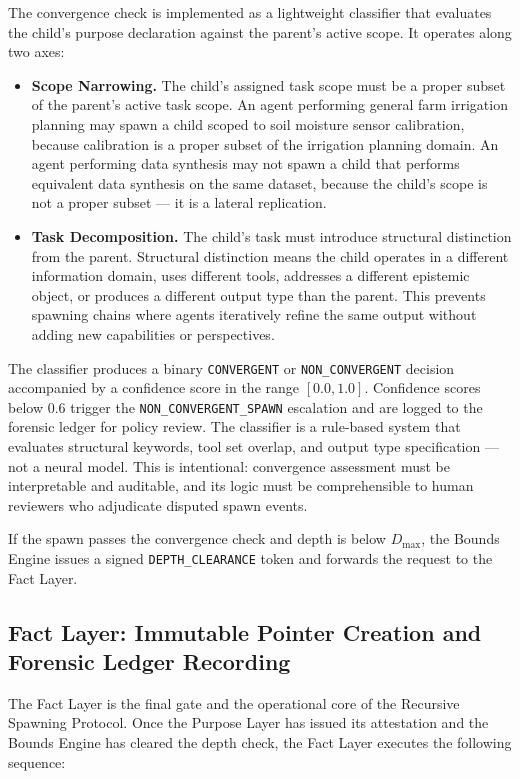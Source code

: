 The convergence check is implemented as a lightweight classifier that evaluates the child's purpose declaration against the parent's active scope. It operates along two axes:

\begin{itemize}
    \item \textbf{Scope Narrowing.} The child's assigned task scope must be a proper subset of the parent's active task scope. An agent performing general farm irrigation planning may spawn a child scoped to soil moisture sensor calibration, because calibration is a proper subset of the irrigation planning domain. An agent performing data synthesis may not spawn a child that performs equivalent data synthesis on the same dataset, because the child's scope is not a proper subset — it is a lateral replication.
    \item \textbf{Task Decomposition.} The child's task must introduce structural distinction from the parent. Structural distinction means the child operates in a different information domain, uses different tools, addresses a different epistemic object, or produces a different output type than the parent. This prevents spawning chains where agents iteratively refine the same output without adding new capabilities or perspectives.
\end{itemize}

The classifier produces a binary \texttt{CONVERGENT} or \texttt{NON\_CONVERGENT} decision accompanied by a confidence score in the range $[0.0, 1.0]$. Confidence scores below $0.6$ trigger the \texttt{NON\_CONVERGENT\_SPAWN} escalation and are logged to the forensic ledger for policy review. The classifier is a rule-based system that evaluates structural keywords, tool set overlap, and output type specification — not a neural model. This is intentional: convergence assessment must be interpretable and auditable, and its logic must be comprehensible to human reviewers who adjudicate disputed spawn events.

If the spawn passes the convergence check and depth is below $D_{\max}$, the Bounds Engine issues a signed \texttt{DEPTH\_CLEARANCE} token and forwards the request to the Fact Layer.

\subsection{Fact Layer: Immutable Pointer Creation and Forensic Ledger Recording}

The Fact Layer is the final gate and the operational core of the Recursive Spawning Protocol. Once the Purpose Layer has issued its attestation and the Bounds Engine has cleared the depth check, the Fact Layer executes the following sequence:

